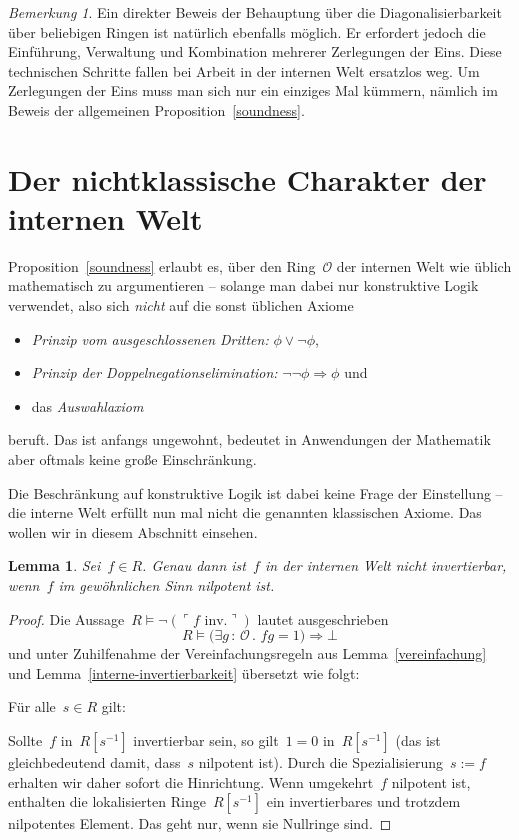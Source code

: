 \documentclass[a4paper,ngerman,12pt]{scrartcl}
\theoremstyle{definition}
\theoremstyle{plain}
\newtheorem{lemma}[defn]{Lemma}
\theoremstyle{remark}
\newtheorem{bem}[defn]{Bemerkung}
\renewcommand{\O}{\mathcal{O}}
\renewcommand{\_}{\mathpunct{.}\,}
\newcommand{\?}{\,{:}\,}
\newcommand{\speak}[1]{\ulcorner\text{#1}\urcorner}
\newenvironment{indentblock}{%
  \list{}{\leftmargin\leftmargin}%
  \item\relax
}{%
  \endlist
}
\begin{document}
\begin{bem}Ein direkter Beweis der Behauptung über die Diagonalisierbarkeit
über beliebigen Ringen ist natürlich ebenfalls möglich. Er erfordert jedoch
die Einführung, Verwaltung und Kombination mehrerer Zerlegungen der Eins. Diese
technischen Schritte fallen bei Arbeit in der internen Welt ersatzlos weg. Um
Zerlegungen der Eins muss man sich nur ein einziges Mal kümmern, nämlich im
Beweis der allgemeinen Proposition~\ref{soundness}.\end{bem}


\section{Der nichtklassische Charakter der internen Welt}

Proposition~\ref{soundness} erlaubt es, über den Ring~$\O$ der internen Welt
wie üblich mathematisch zu argumentieren -- solange man dabei nur konstruktive
Logik verwendet, also sich \emph{nicht} auf die sonst üblichen Axiome
\begin{itemize}
\item \emph{Prinzip vom ausgeschlossenen Dritten:} $\phi \vee \neg\phi$,
\item \emph{Prinzip der Doppelnegationselimination:} $\neg\neg\phi \Rightarrow
\phi$ und
\item das \emph{Auswahlaxiom}
\end{itemize}
beruft. Das ist anfangs ungewohnt, bedeutet in Anwendungen der Mathematik aber
oftmals keine große Einschränkung.

Die Beschränkung auf konstruktive Logik ist dabei keine Frage der Einstellung
-- die interne Welt erfüllt nun mal nicht die genannten klassischen Axiome. Das
wollen wir in diesem Abschnitt einsehen.

\begin{lemma}Sei~$f \in R$. Genau dann ist~$f$ in der internen Welt nicht
invertierbar, wenn~$f$ im gewöhnlichen Sinn nilpotent ist.\end{lemma}
\begin{proof}Die Aussage~$R \models \neg(\speak{$f$ inv.})$ lautet ausgeschrieben
\[ R \models \bigl(\exists g\?\O\_ fg = 1\bigr) \Rightarrow \bot \]
und unter Zuhilfenahme der Vereinfachungsregeln aus Lemma~\ref{vereinfachung}
und Lemma~\ref{interne-invertierbarkeit} übersetzt wie folgt:
\begin{indentblock}
Für alle~$s \in R$ gilt:
\begin{indentblock}
Sollte~$f$ in~$R[s^{-1}]$ invertierbar sein, so gilt~$1 = 0$ in~$R[s^{-1}]$
(das ist gleichbedeutend damit, dass~$s$ nilpotent ist).
\end{indentblock}
\end{indentblock}
Durch die Spezialisierung~$s := f$ erhalten wir daher sofort die Hinrichtung.
Wenn umgekehrt~$f$ nilpotent ist, enthalten die lokalisierten Ringe~$R[s^{-1}]$
ein invertierbares und trotzdem nilpotentes Element. Das geht nur, wenn sie
Nullringe sind.
\end{proof}
\end{document}

